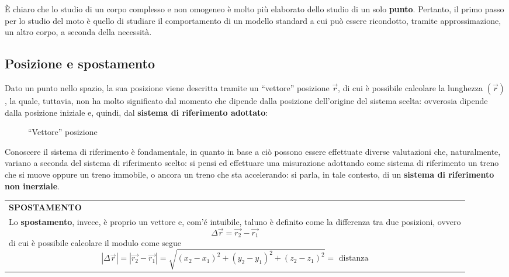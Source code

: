 \documentclass[a4paper]{extarticle}
\newcommand{\quotes}[1]{``#1''}
\renewcommand\arraystretch{}
\begin{document}
\vspace{1em}
\noindent
È chiaro che lo studio di un corpo complesso e non omogeneo è molto più elaborato dello studio di un solo \textbf{punto}. Pertanto, il primo passo per lo studio del moto è quello di studiare il comportamento di un modello standard a cui può essere ricondotto, tramite approssimazione, un altro corpo, a seconda della necessità.

\vspace{1em}
\subsection{Posizione e spostamento}
Dato un punto nello spazio, la sua posizione viene descritta tramite un \quotes{vettore} posizione $\vec{r}$, di cui è possibile calcolare la lunghezza $\left(\vec{r}\right)$, la quale, tuttavia, non ha molto significato dal momento che dipende dalla posizione dell'origine del sistema scelta: ovverosia dipende dalla posizione iniziale e, quindi, dal \textbf{sistema di riferimento adottato}:

\begin{figure}[H]
  \centering
  \caption{\quotes{Vettore} posizione}
  \label{fig:vettore_posizione}
\end{figure}

\vspace{1em}
\noindent
Conoscere il sistema di riferimento è fondamentale, in quanto in base a ciò possono essere effettuate diverse valutazioni che, naturalmente, variano a seconda del sistema di riferimento scelto: si pensi ed effettuare una misurazione adottando come sistema di riferimento un treno che si muove oppure un treno immobile, o ancora un treno che sta accelerando: si parla, in tale contesto, di un \textbf{sistema di riferimento non inerziale}.

\vspace{1em}
\setlength{\tabcolsep}{14pt}
\renewcommand{\arraystretch}{2}
\noindent
\begin{tabularx}{\textwidth}{@{}|P|@{}}
    \hline
    {\textbf{SPOSTAMENTO}}\\
    \parbox{\linewidth}{Lo \textbf{spostamento}, invece, è proprio un vettore e, com'é intuibile, taluno è definito come la differenza tra due posizioni, ovvero
    \[\boxed{\Delta \vec{r} = \vec{r_2} - \vec{r_1}}\]
    di cui è possibile calcolare il modulo come segue
    \[\left \vert \Delta \vec{r} \right \vert = \left \vert \vec{r_2} - \vec{r_1} \right \vert = \sqrt{\left(x_2 - x_1\right)^2 + \left(y_2 - y_1\right)^2 + \left(z_2 - z_1\right)^2} = \text{ distanza}\]
    \vspace{1mm}}\\
    \hline
\end{tabularx}
\end{document}
